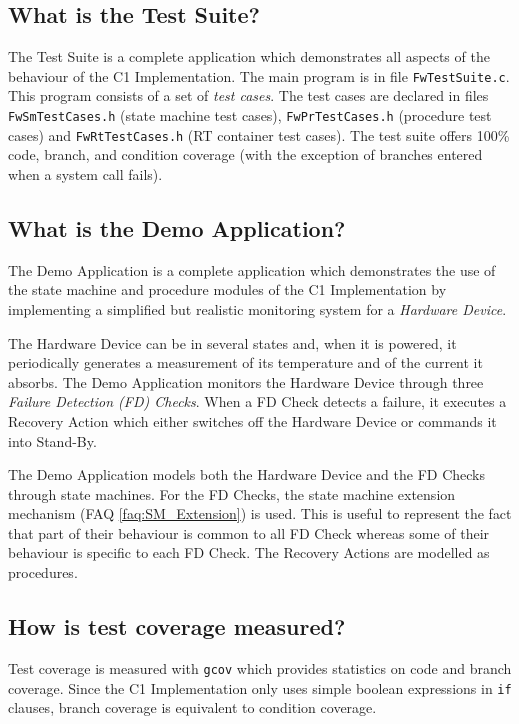 \documentclass[a4paper,10pt]{article}
\begin{document}
\subsection{What is the Test Suite?}\label{faq:test_suite}
The Test Suite is a complete application which demonstrates all aspects of the behaviour of the C1 Implementation. 
The main program is in file \texttt{FwTestSuite.c}. This program consists of a set of \emph{test cases}. The test cases are declared 
in files \texttt{FwSmTestCases.h} (state machine test cases), \texttt{FwPrTestCases.h} (procedure test cases) and \texttt{FwRtTestCases.h} (RT container test cases). The test suite offers 100\% code, branch, and condition coverage (with the exception of branches entered when a system call fails). 


\subsection{What is the Demo Application?}\label{faq:demo_application}
The Demo Application is a complete application which demonstrates the use of the state machine and procedure modules of the C1 Implementation by implementing a simplified but realistic monitoring system for a \emph{Hardware Device}.

The Hardware Device can be in several states and, when it is powered, it periodically generates a measurement of its temperature and of the current it absorbs. The Demo Application monitors the Hardware Device through three \emph{Failure Detection (FD) Checks}. When a FD Check detects a failure, it executes a Recovery Action which either switches off the Hardware Device or commands it into Stand-By. 

The Demo Application models both the Hardware Device and the FD Checks through state machines. For the FD Checks, the state machine extension mechanism (FAQ \ref{faq:SM_Extension}) is used. This is useful to represent the fact that part of their behaviour is common to all FD Check whereas some of their behaviour is specific to each FD Check. The Recovery Actions are modelled as procedures.


\subsection{How is test coverage measured?}
Test coverage is measured with \texttt{gcov} which provides statistics on code and branch coverage. Since the C1 Implementation only uses simple boolean 
expressions in \texttt{if} clauses, branch coverage is equivalent to condition coverage. 
\end{document}

